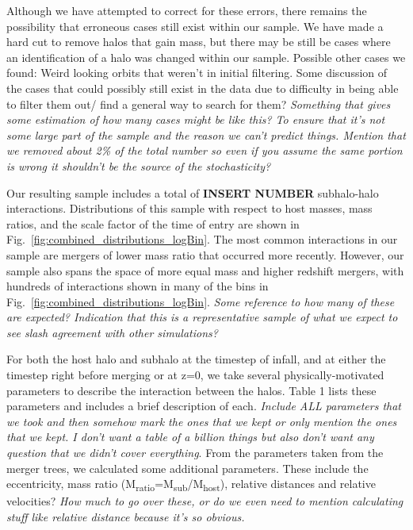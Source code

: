 \documentclass[fleqn,usenatbib]{mnras}
\begin{document}
\par
	Although we have attempted to correct for these errors, there remains the possibility that erroneous cases still exist within our sample. We have made a hard cut to remove halos that gain mass, but there may be still be cases where an identification of a halo was changed within our sample. Possible other cases we found: Weird looking orbits that weren't in initial filtering. Some discussion of the cases that could possibly still exist in the data due to difficulty in being able to filter them out/ find a general way to search for them? \textit{Something that gives some estimation of how many cases might be like this? To ensure that it's not some large part of the sample and the reason we can't predict things. Mention that we removed about 2\% of the total number so even if you assume the same portion is wrong it shouldn't be the source of the stochasticity?}
\par
    Our resulting sample includes a total of \textbf{INSERT NUMBER} subhalo-halo interactions. Distributions of this sample with respect to host masses, mass ratios, and the scale factor of the time of entry are shown in Fig.~\ref{fig:combined_distributions_logBin}. The most common interactions in our sample are mergers of lower mass ratio that occurred more recently. However, our sample also spans the space of more equal mass and higher redshift mergers, with hundreds of interactions shown in many of the bins in Fig.~\ref{fig:combined_distributions_logBin}. \textit{Some reference to how many of these are expected? Indication that this is a representative sample of what we expect to see slash agreement with other simulations?}
\par
    For both the host halo and subhalo at the timestep of infall, and at either the timestep right before merging or at z=0, we take several physically-motivated parameters to describe the interaction between the halos. Table 1 lists these parameters and includes a brief description of each. \textit{Include ALL parameters that we took and then somehow mark the ones that we kept or only mention the ones that we kept. I don't want a table of a billion things but also don't want any question that we didn't cover everything}. From the parameters taken from the merger trees, we calculated some additional parameters. These include the eccentricity, mass ratio (M\textsubscript{ratio}=M\textsubscript{sub}/M\textsubscript{host}), relative distances and relative velocities? \textit{How much to go over these, or do we even need to mention calculating stuff like relative distance because it's so obvious.}
\end{document}
